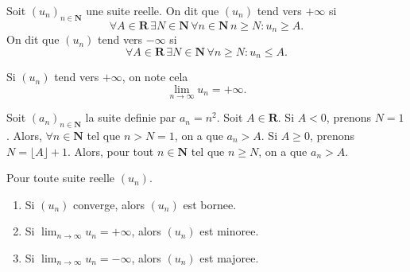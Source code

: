 \begin{definition}
Soit $(u_{n})_{n\in \mathbf{N}}$ une suite reelle. On dit que $(u_{n})$ tend vers $+\infty$ si 
$$
\forall A\in \mathbf{R}\,\exists N\in \mathbf{N}\,\forall n\in \mathbf{N}\,n\ge N:u_{n}\ge A.
$$
On dit que $(u_{n})$ tend vers $-\infty$ si
$$
\forall A\in \mathbf{R}\,\exists N\in \mathbf{N}\,\forall n\ge N:u_{n}\le A.
$$
\end{definition}
\begin{notation}
Si $(u_{n})$ tend vers $+\infty$, on note cela
$$
\lim_{ n \to \infty } u_{n}=+\infty.
$$
\end{notation}
\begin{example}
Soit $(a_{n})_{n\in \mathbf{N}}$ la suite definie par $a_{n}=n^{2}$. Soit $A\in \mathbf{R}$. Si $A<0$, prenons $N=1$. Alors, $\forall n\in \mathbf{N}$ tel que $n>N=1$, on a que $a_{n}>A$. Si $A\ge 0$, prenons $N=\lfloor A \rfloor +1$. Alors, pour tout $n\in \mathbf{N}$ tel que $n\ge N$, on a que $a_{n}>A$.
\end{example}
\begin{proposition}
Pour toute suite reelle $(u_{n})$. 
\begin{enumerate}
\item Si $(u_{n})$ converge, alors $(u_{n})$ est bornee.
\item Si $\lim_{ n \to \infty }u_{n}=+\infty$, alors $(u_{n})$ est minoree.
\item Si $\lim_{ n \to \infty }u_{n}=-\infty$, alors $(u_{n})$ est majoree.
\end{enumerate}
\end{proposition}

